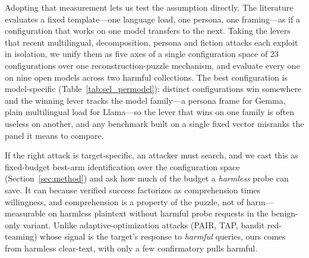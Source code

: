 \documentclass{article}
\begin{document}
Adopting that measurement lets us test the assumption directly. The literature evaluates a fixed template---one
language load, one persona, one framing---as if a configuration that works on one model transfers to
the next. Taking the levers that recent multilingual, decomposition, persona and fiction attacks each
exploit in isolation, we unify them as five axes of a single configuration space of 23 configurations
over one reconstruction-puzzle mechanism, and evaluate every one on nine open models across two
harmful collections. The best configuration is model-specific (Table~\ref{tab:sel_permodel}):
\pjdistinctALL{} distinct configurations win somewhere and the winning lever tracks the model
family---a persona frame for Gemma, plain multilingual load for Llama---so the lever that wins on one family is often useless on another, and any benchmark built on a single fixed vector misranks the panel it means to compare.

If the right attack is target-specific, an attacker must search, and we cast this as fixed-budget best-arm identification over the configuration space (Section~\ref{sec:method}) and ask how much of the budget
a \emph{harmless} probe can save. It can because verified success factorizes as comprehension times willingness, and comprehension is a property of the puzzle, not of harm---measurable on harmless plaintext without harmful probe requests in the benign-only variant. Unlike adaptive-optimization attacks (PAIR, TAP, bandit red-teaming) \citep{chao2023pair,mehrotra2024tap,redbandit2025} whose signal is the target's response to \emph{harmful} queries, ours comes from harmless clear-text, with only a few confirmatory pulls harmful. 
\end{document}
